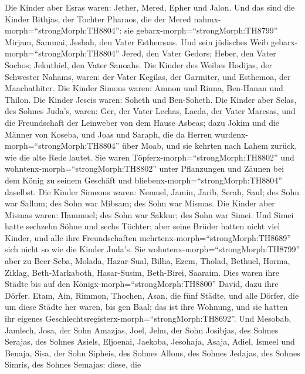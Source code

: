 Die Kinder aber Esras waren: Jether, Mered, Epher und Jalon. Und das
sind die Kinder Bithjas, der Tochter Pharaos, die der Mered
nahmx-morph=``strongMorph:TH8804'': sie
gebarx-morph=``strongMorph:TH8799'' Mirjam, Sammai, Jesbah, den Vater
Esthemoas.  Und sein jüdisches Weib
gebarx-morph=``strongMorph:TH8804'' Jered, den Vater Gedors; Heber, den
Vater Sochos; Jekuthiel, den Vater Sanoahs.  Die Kinder des
Weibes Hodijas, der Schwester Nahams, waren: der Vater Kegilas, der
Garmiter, und Esthemoa, der Maachathiter.  Die Kinder
Simons waren: Amnon und Rinna, Ben-Hanan und Thilon. Die Kinder Jeseis
waren: Soheth und Ben-Soheth.  Die Kinder aber Selas, des
Sohnes Juda's, waren: Ger, der Vater Lechas, Laeda, der Vater Maresas,
und die Freundschaft der Leinweber von dem Hause Asbeas; 
dazu Jokim und die Männer von Koseba, und Joas und Saraph, die da Herren
wurdenx-morph=``strongMorph:TH8804'' über Moab, und sie kehrten nach
Lahem zurück, wie die alte Rede lautet.  Sie waren
Töpferx-morph=``strongMorph:TH8802'' und
wohntenx-morph=``strongMorph:TH8802'' unter Pflanzungen und Zäunen bei
dem König zu seinem Geschäft und bliebenx-morph=``strongMorph:TH8804''
daselbst.  Die Kinder Simeons waren: Nemuel, Jamin, Jarib,
Serah, Saul;  des Sohn war Sallum; des Sohn war Mibsam; des
Sohn war Mismas.  Die Kinder aber Mismas waren: Hammuel;
des Sohn war Sakkur; des Sohn war Simei.  Und Simei hatte
sechzehn Söhne und sechs Töchter; aber seine Brüder hatten nicht viel
Kinder, und alle ihre Freundschaften
mehrtenx-morph=``strongMorph:TH8689'' sich nicht so wie die Kinder
Juda's.  Sie wohntenx-morph=``strongMorph:TH8799'' aber zu
Beer-Seba, Molada, Hazar-Sual,  Bilha, Ezem, Tholad,
 Bethuel, Horma, Ziklag,  Beth-Markaboth,
Hasar-Susim, Beth-Birei, Saaraim. Dies waren ihre Städte bis auf den
Königx-morph=``strongMorph:TH8800'' David, dazu ihre Dörfer.
 Etam, Ain, Rimmon, Thochen, Asan, die fünf Städte,
 und alle Dörfer, die um diese Städte her waren, bis gen
Baal; das ist ihre Wohnung, und sie hatten ihr eigenes
Geschlechtsregisterx-morph=``strongMorph:TH8692''.  Und
Mesobab, Jamlech, Josa, der Sohn Amazjas,  Joel, Jehu, der
Sohn Josibjas, des Sohnes Serajas, des Sohnes Asiels, 
Eljoenai, Jaekoba, Jesohaja, Asaja, Adiel, Ismeel und Benaja,
 Sisa, der Sohn Sipheis, des Sohnes Allons, des Sohnes
Jedajas, des Sohnes Simris, des Sohnes Semajas:  diese, die

